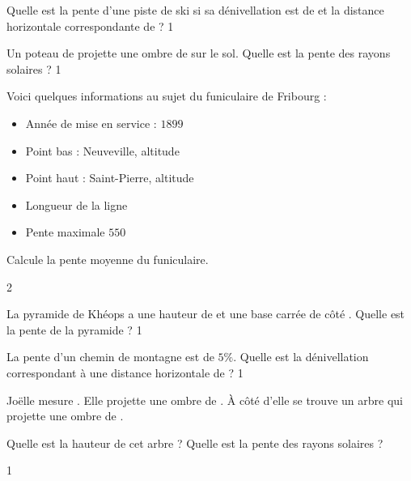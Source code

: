 \documentclass[a4paper,11pt]{report}
\begin{document}

\begin{exo}{
    Quelle est la pente d'une piste de ski si sa dénivellation est de  et la distance horizontale correspondante de  ?
}{1}
\end{exo}


\begin{exo}{
    Un poteau de  projette une ombre de  sur le sol. Quelle est la pente des rayons solaires ?
}{1}
\end{exo}




\begin{exo}{
    Voici quelques informations au sujet du funiculaire de Fribourg :
    \begin{itemize}
        \item Année de mise en service : $1899$
        \item Point bas : Neuveville, altitude 
        \item Point haut : Saint-Pierre, altitude 
        \item Longueur de la ligne 
        \item Pente maximale $550$\textperthousand
    \end{itemize}
    Calcule la pente moyenne du funiculaire.
}{2}    
\end{exo}

\begin{exo}{
La pyramide de Khéops a une hauteur de  et une base carrée de côté . Quelle est la pente de la
pyramide ?
}{1}
\end{exo}



\begin{exo}{
    La pente d'un chemin de montagne est de $5\%$. Quelle est la dénivellation correspondant à une distance horizontale de  ?
}{1}
\end{exo}

\begin{exo}{
    Joëlle mesure . Elle projette une ombre de .
    À côté d'elle se trouve un arbre qui projette une ombre de .

    \begin{tasks}
        \task Quelle est la hauteur de cet arbre ?
        \task Quelle est la pente des rayons solaires ?
    \end{tasks}
    
}{1}    
\end{exo}
\end{document}
